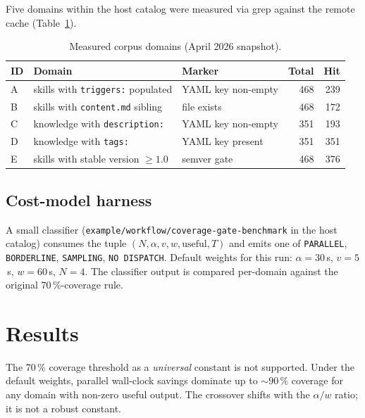 \documentclass[10pt,letterpaper]{article}
\begin{document}
Five domains within the host catalog were measured via grep against the
remote cache (Table~\ref{tab:workloads}).

\begin{table}[h]
\centering
\caption{Measured corpus domains (April 2026 snapshot).}
\label{tab:workloads}
\begin{tabular}{lllrr}
\toprule
ID & Domain & Marker & Total & Hit \\
\midrule
A & skills with \texttt{triggers:} populated & YAML key non-empty & 468 & 239 \\
B & skills with \texttt{content.md} sibling & file exists & 468 & 172 \\
C & knowledge with \texttt{description:} & YAML key non-empty & 351 & 193 \\
D & knowledge with \texttt{tags:} & YAML key present & 351 & 351 \\
E & skills with stable version $\geq 1.0$ & semver gate & 468 & 376 \\
\bottomrule
\end{tabular}
\end{table}

\subsection{Cost-model harness}

A small classifier (\texttt{example/workflow/coverage-gate-benchmark} in
the host catalog) consumes the tuple $(N, \alpha, v, w, \mathrm{useful}, T)$
and emits one of \texttt{PARALLEL}, \texttt{BORDERLINE}, \texttt{SAMPLING},
\texttt{NO DISPATCH}. Default weights for this run:
$\alpha = 30$\,s, $v = 5$\,s, $w = 60$\,s, $N = 4$. The classifier output is
compared per-domain against the original 70\,\%-coverage rule.

\section{Results}
\label{sec:results}

The 70\,\% coverage threshold as a \emph{universal} constant is not
supported. Under the default weights, parallel wall-clock savings dominate
up to $\sim 90\,\%$ coverage for any domain with non-zero useful output.
The crossover shifts with the $\alpha/w$ ratio; it is not a robust
constant.
\end{document}
